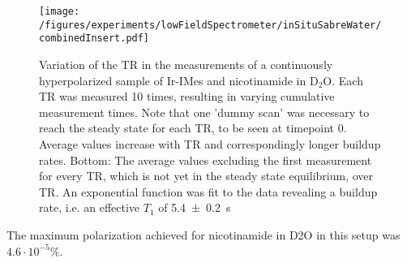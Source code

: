        \begin{figure}
            \texttt{[image: /figures/experiments/lowFieldSpectrometer/inSituSabreWater/combinedInsert.pdf]}
            \caption[TR variation]{Variation of the TR in the measurements of a continuously hyperpolarized sample of Ir-IMes and nicotinamide in D$_2$O. Each TR was measured 10 times, resulting in varying cumulative measurement times. Note that one 'dummy scan' was necessary to reach the steady state for each TR, to be seen at timepoint 0. Average values increase with TR and correspondingly longer buildup rates. Bottom: The average values excluding the first measurement for every TR, which is not yet in the steady state equilibrium, over TR. An exponential function was fit to the data revealing a buildup rate, i.e. an effective $T_1$ of \SI{5.4\pm 0.2}{\second}}
            \label{fig:results:lowFieldSpectrometer:TRvariation}
        \end{figure}
        The maximum polarization achieved for nicotinamide in D2O in this setup was $4.6\cdot 10^{-5}\si{\percent}$.
